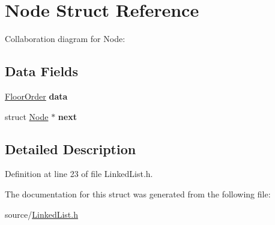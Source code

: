 \hypertarget{structNode}{}\section{Node Struct Reference}
\label{structNode}


Collaboration diagram for Node\+:
\subsection*{Data Fields}
\begin{DoxyCompactItemize}
\item 
\mbox{\label{structNode_aadd111f9556a823094ebd6f878be1079}} 
\hyperlink{structFloorOrder}{Floor\+Order} {\bfseries data}
\item 
\mbox{\label{structNode_af67b110ca1a258b793bf69d306929b22}} 
struct \hyperlink{structNode}{Node} $\ast$ {\bfseries next}
\end{DoxyCompactItemize}


\subsection{Detailed Description}


Definition at line 23 of file Linked\+List.\+h.



The documentation for this struct was generated from the following file\+:\begin{DoxyCompactItemize}
\item 
source/\hyperlink{LinkedList_8h}{Linked\+List.\+h}\end{DoxyCompactItemize}
